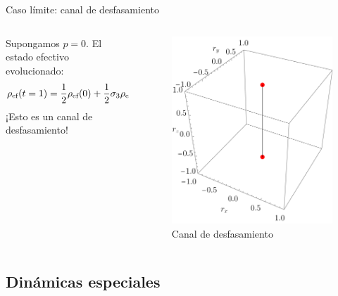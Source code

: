 \begin{frame}{Caso límite: canal de desfasamiento}
    \begin{columns}
        \begin{column}{0.5\textwidth}
            Supongamos $p=0$. El estado efectivo evolucionado:
            \begin{equation*}
              \rho_{\text{ef}}(t=1)=\frac{1}{2}\rho_{\text{ef}}(0)+\frac{1}{2}\sigma_{3}\rho_{\text{ef}}(0)\sigma_{3}.
            \end{equation*}\pause
            ¡Esto es un canal de desfasamiento!\pause
        \end{column}
        \begin{column}{0.5\textwidth}
            \begin{figure}[h!]
                \centering
                \includegraphics[width=0.7\linewidth]{figures/maxent_results/CNOT_p=1._t=1_r=0.9.png}
                \caption{Canal de desfasamiento}
              \end{figure}
        \end{column}
    \end{columns}
\end{frame}


\subsection{Dinámicas especiales}

